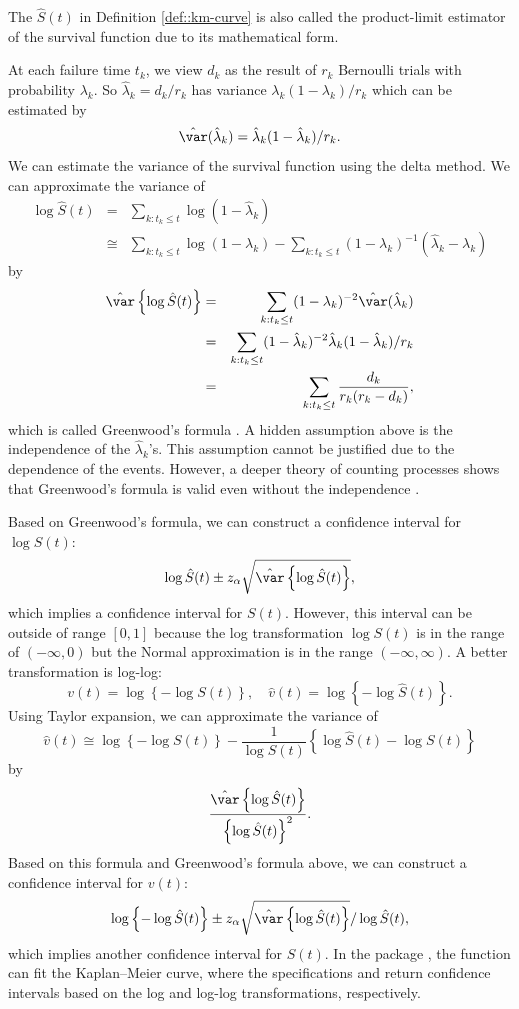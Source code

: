 The $\hat{S}(t)$ in Definition \ref{def::km-curve}  is also called the product-limit estimator
of the survival function due to its mathematical form.



At each failure time $t_{k}$, we view $d_{k}$ as the result of $r_{k}$
Bernoulli trials with probability $\lambda_{k}$. So $\hat{\lambda}_{k}=d_{k}/r_{k}$
has variance $\lambda_{k}(1-\lambda_{k})/r_{k}$ which can be estimated
by 
\[
\hat{\var}(\hat{\lambda}_{k})=\hat{\lambda}_{k}(1-\hat{\lambda}_{k})/r_{k}.
\]
We can estimate the variance of the survival function using the delta
method. We can approximate the variance of
\begin{eqnarray*}
\log\hat{S}(t) 
&=& \sum_{k:t_{k}\leq t}\log(1-\hat{\lambda}_{k}) \\ 
&\cong & \sum_{k:t_{k}\leq t}\log(1-\lambda_{k})-\sum_{k:t_{k}\leq t}(1-\lambda_{k})^{-1}(\hat{\lambda}_{k}-\lambda_{k})
\end{eqnarray*}
by
\begin{eqnarray*}
\hat{\var}\left\{ \log\hat{S}(t)\right\}  &=&\sum_{k:t_{k}\leq t}(1-\lambda_{k})^{-2}\hat{\var}(\hat{\lambda}_{k}) \\
&=&\sum_{k:t_{k}\leq t}(1-\hat{\lambda}_{k})^{-2}\hat{\lambda}_{k}(1-\hat{\lambda}_{k})/r_{k}\\
&=&\sum_{k:t_{k}\leq t}\frac{d_{k}}{r_{k}(r_{k}-d_{k})},
\end{eqnarray*}
which is called Greenwood's formula \citep{greenwood1926report}. A hidden assumption above is the independence of the $\hat{\lambda}_k$'s. This assumption cannot be justified due to the dependence of the events. However, a deeper theory of counting processes shows that  Greenwood's formula is valid even without the independence \citep{fleming2011counting}. 


Based on Greenwood's formula, we can construct a confidence interval for $\log S(t)$:
\[
\log\hat{S}(t)\pm z_{\alpha}\sqrt{\hat{\var}\left\{ \log\hat{S}(t)\right\} },
\]
which implies a confidence interval for $S(t)$. However, this interval
can be outside of range $[0,1]$ because the log transformation $\log S(t)$ is in the range of $(-\infty, 0)$ but the Normal approximation is in the range $(-\infty, \infty).$ 
A better transformation is log-log:
\[
v(t)=\log\left\{ -\log S(t)\right\} ,\quad\hat{v}(t)=\log\left\{ -\log\hat{S}(t)\right\} .
\]
Using Taylor expansion, we can approximate the variance of 
\[
\hat{v}(t)\cong\log\left\{ -\log S(t)\right\} -\frac{1}{\log S(t)}\left\{  \log \hat{S}(t)- \log S(t)\right\} 
\]
by 
\[
\frac{\hat{\var}\left\{ \log\hat{S}(t)\right\} }{\left\{ \log\hat{S}(t)\right\} ^{2}}.
\]
Based on this formula and Greenwood's formula above, we can construct
a confidence interval for $v(t)$:
\[
\log\left\{ -\log\hat{S}(t)\right\} \pm z_{\alpha}\sqrt{\hat{\var}\left\{ \log\hat{S}(t)\right\} }/\log\hat{S}(t),
\]
which implies another confidence interval for $S(t)$. 
In the  package , the function  can fit the Kaplan--Meier curve, where the specifications  and  return confidence intervals based on the log and log-log transformations, respectively.  




